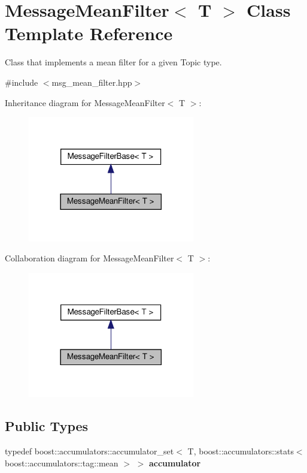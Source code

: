 \hypertarget{classMessageMeanFilter}{}\section{Message\+Mean\+Filter$<$ T $>$ Class Template Reference}
\label{classMessageMeanFilter}


Class that implements a mean filter for a given Topic type.  




{\ttfamily \#include $<$msg\+\_\+mean\+\_\+filter.\+hpp$>$}



Inheritance diagram for Message\+Mean\+Filter$<$ T $>$\+:
\nopagebreak
\begin{figure}[H]
\begin{center}
\leavevmode
\includegraphics[width=206pt]{dd/d60/classMessageMeanFilter__inherit__graph}
\end{center}
\end{figure}


Collaboration diagram for Message\+Mean\+Filter$<$ T $>$\+:
\nopagebreak
\begin{figure}[H]
\begin{center}
\leavevmode
\includegraphics[width=206pt]{d2/db9/classMessageMeanFilter__coll__graph}
\end{center}
\end{figure}
\subsection*{Public Types}
\begin{DoxyCompactItemize}
\item 
\mbox{\label{classMessageMeanFilter_aabbf6eb4a2e2251228ece38f88609d29}} 
typedef boost\+::accumulators\+::accumulator\+\_\+set$<$ T, boost\+::accumulators\+::stats$<$ boost\+::accumulators\+::tag\+::mean $>$ $>$ {\bfseries accumulator}
\end{DoxyCompactItemize}
